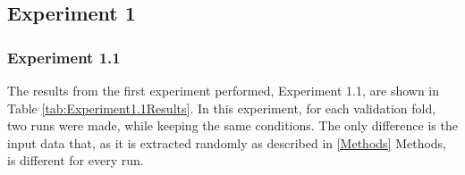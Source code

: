 \subsection{Experiment 1}

\subsubsection{Experiment 1.1}

The results from the first experiment performed, Experiment 1.1, are shown in Table \ref{tab:Experiment1.1Results}. In this experiment, for each validation fold, two runs were made, while keeping the same conditions. The only difference is the input data that, as it is extracted randomly  as described in \ref{Methods} Methods, is different for every run. 

\begin{table}[!ht]
	\caption{Dice scores for every vendor and fluid for the runs done in Experiment 1.1. The conditions were the same for both sets except the extracted patches that are different in every run due to the random process of extracting them.}
	\centering
\end{table}
